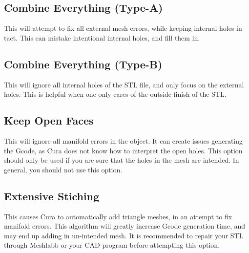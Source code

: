 \subsection{Combine Everything (Type-A)}

This will attempt to fix all external mesh errors, while keeping internal holes in tact. This can mistake intentional internal holes, and fill them in.

\subsection{Combine Everything (Type-B)}

This will ignore all internal holes of the STL file, and only focus on the external holes. This is helpful when one only cares of the outside finish of the STL.

\subsection{Keep Open Faces}

This will ignore all manifold errors in the object. It can create issues generating the Gcode, as Cura does not know how to interpret the open holes. This option should only be used if you are sure that the holes in the mesh are intended. In general, you should not use this option.

\subsection{Extensive Stiching}

This causes Cura to automatically add triangle meshes, in an attempt to fix manifold errors. This algorithm will greatly increase Gcode generation time, and may end up adding in un-intended mesh. It is recommended to repair your STL through Meshlabb or your CAD program before attempting this option.
